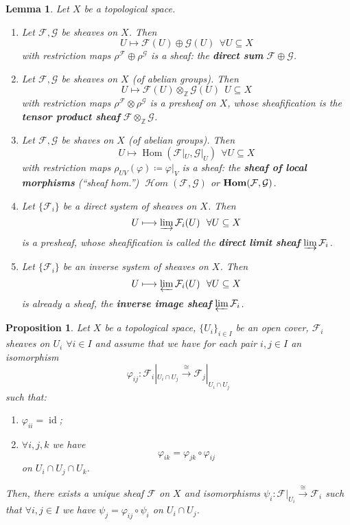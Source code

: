 \documentclass[12pt]{article}
\DeclareMathOperator{\id}{id}
\DeclareMathOperator{\Hom}{Hom}
\DeclareMathOperator{\shHom}{\mathcal{H}\textit{om}}
\DeclareMathOperator{\HOM}{\textnormal{\textbf{Hom}}}
\newtheorem*{proposition}{Proposition}
\newtheorem*{lemma}{Lemma}
\theoremstyle{definition}
\theoremstyle{remark}
\begin{document}
\begin{lemma}
Let $X$ be a topological space.

\begin{enumerate}[label=\arabic*)]
\item Let $\mathcal{F},\mathcal{G}$ be sheaves on $X$. Then
\[U\longmapsto\mathcal{F}(U)\oplus\mathcal{G}(U)\ \ \forall U\subseteq X\]
with restriction maps $\rho^{\mathcal{F}}\oplus\rho^{\mathcal{G}}$ is a sheaf: the \textbf{direct sum} $\mathcal{F}\oplus\mathcal{G}$.

\item Let $\mathcal{F},\mathcal{G}$ be sheaves on $X$ (of abelian groups). Then
\[U\longmapsto\mathcal{F}(U)\otimes_{\mathbb{Z}}\mathcal{G}(U)\ \ U\subseteq X\]
with restriction maps $\rho^{\mathcal{F}}\otimes\rho^{\mathcal{G}}$ is a presheaf on $X$, whose sheafification is the \textbf{tensor product sheaf} $\mathcal{F}\otimes_{\mathbb{Z}}\mathcal{G}$.

\item Let $\mathcal{F},\mathcal{G}$ be shaves on $X$ (of abelian groups). Then
\[U\longmapsto\Hom(\mathcal{F}|_U,\mathcal{G}|_U)\ \ \forall U\subseteq X\]
with restriction maps $\rho_{UV}(\varphi)\coloneqq\varphi|_V$ is a sheaf: the \textbf{sheaf of local morphisms} (``sheaf hom.'') $\shHom(\mathcal{F},\mathcal{G})$ or $\HOM(\mathcal{F},\mathcal{G})$.

\item Let $\{\mathcal{F}_i\}$ be a direct system of sheaves on $X$. Then
\[U\longmapsto\varinjlim\mathcal{F}_i(U)\ \ \forall U\subseteq X\]
is a presheaf, whose sheafification is called the \textbf{direct limit sheaf} $\varinjlim\mathcal{F}_i$.

\item Let $\{\mathcal{F}_i\}$ be an inverse system of sheaves on $X$. Then
\[U\longmapsto\varprojlim\mathcal{F}_i(U)\ \ \forall U\subseteq X\]
is already a sheaf, the \textbf{inverse image sheaf} $\varprojlim\mathcal{F}_i$.
\end{enumerate}
\end{lemma}

\begin{proposition}
Let $X$ be a topological space, $\{U_i\}_{i\in I}$ be an open cover, $\mathcal{F}_i$ sheaves on $U_i$ $\forall i\in I$ and assume that we have for each pair $i,j\in I$ an isomorphism
\[\varphi_{ij}:\mathcal{F}_i|_{U_i\cap U_j}\overset{\cong}{\longrightarrow}\mathcal{F}_j|_{U_i\cap U_j}\]
such that:
\begin{enumerate}[label=\arabic*)]
\item $\varphi_{ii}=\id$;
\item $\forall i,j,k$ we have
\[\varphi_{ik}=\varphi_{jk}\circ\varphi_{ij}\]
on $U_i\cap U_j\cap U_k$.
\end{enumerate}

Then, there exists a unique sheaf $\mathcal{F}$ on $X$ and isomorphisms $\psi_i:\mathcal{F}|_{U_i}\xrightarrow{\cong}\mathcal{F}_i$ such that $\forall i,j\in I$ we have $\psi_j=\varphi_{ij}\circ\psi_i$ on $U_i\cap U_j$.
\end{proposition}
\end{document}
